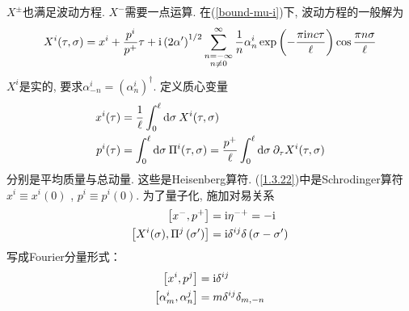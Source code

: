 $X^\pm$也满足波动方程. $X^-$需要一点运算. 在(\ref{bound-mu-i})下, 波动方程的一般解为
\begin{equation}
X^{i}(\tau, \sigma)=x^{i}+\frac{p^{i}}{p^{+}} \tau+\mathrm{i}\left(2 \alpha^{\prime}\right)^{1 / 2} \sum_{\substack{n=-\infty  \\  n \neq 0}}^{\infty} \frac{1}{n} \alpha_{n}^{i} \exp \left(-\frac{\pi \mathrm{i} n c \tau}{\ell}\right) \cos \frac{\pi n \sigma}{\ell} \label{1.3.22}
\end{equation}
$X^i$是实的, 要求$\alpha_{-n}^{i}=\left(\alpha_{n}^{i}\right)^{\dagger}$. 定义质心变量
\begin{subequations}
\begin{align}
x^{i}(\tau)&=\frac{1}{\ell} \int_{0}^{\ell} \mathrm{d} \sigma\: X^{i}(\tau, \sigma) \\
p^{i}(\tau)&=\int_{0}^{\ell} \mathrm{d} \sigma\: \Pi^{i}(\tau, \sigma)=\frac{p^{+}}{\ell} \int_{0}^{\ell} \mathrm{d} \sigma \:\partial_{\tau} X^{i}(\tau, \sigma)
\end{align}
\end{subequations}
分别是平均质量与总动量. 
这些是Heisenberg算符. (\ref{1.3.22})中是Schrodinger算符$x^{i} \equiv x^{i}(0)$ ,  $p^{i} \equiv p^{i}(0)$.
为了量子化, 施加对易关系
\begin{subequations}
\begin{align}
\left[x^{-}, p^{+}\right]&=\mathrm{i} \eta^{-+}=-\mathrm{i}  \label{1.3.24a}\\
\left[X^{i}(\sigma), \Pi^{j}\left(\sigma^{\prime}\right)\right]&=\mathrm{i} \delta^{i j} \delta\left(\sigma-\sigma^{\prime}\right)
\label{1.3.24b}
\end{align}
\end{subequations}
写成Fourier分量形式：
\begin{subequations}
\begin{align}
\left[x^{i}, p^{j}\right]&=\mathrm{i} \delta^{i j}   \label{1.3.25a}\\
\left[\alpha_{m}^{i}, \alpha_{n}^{j}\right]&=m \delta^{i j} \delta_{m,-n}   \label{1.3.25b}
\end{align} \label{1.3.25}
\end{subequations}
